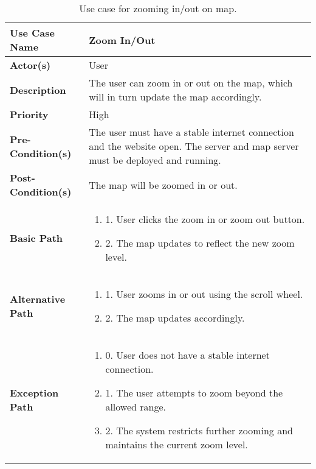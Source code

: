 \begin{table}[h]
    \centering
    \renewcommand{\arraystretch}{1.5}
    \begin{tabularx}{\textwidth}{|l|X|}
        \hline
        \rowcolor{gray!20}
        \textbf{Use Case Name} & Zoom In/Out \\
        \hline
        \textbf{Actor(s)} & User \\
        \hline
        \textbf{Description} & The user can zoom in or out on the map, which will in turn update the map accordingly. \\
        \hline
        \textbf{Priority} & High \\
        \hline
        \textbf{Pre-Condition(s)} & The user must have a stable internet connection and the website open. The server and map server must be deployed and running. \\
        \hline
        \textbf{Post-Condition(s)} & The map will be zoomed in or out. \\
        \hline
        \textbf{Basic Path} &  
        \begin{enumerate}[label=,left=0pt]
            \item 1. User clicks the zoom in or zoom out button.
            \item 2. The map updates to reflect the new zoom level.
        \end{enumerate} \\
        \hline
        \textbf{Alternative Path} & 
        \begin{enumerate}[label=,left=0pt]
            \item 1. User zooms in or out using the scroll wheel.
            \item 2. The map updates accordingly.
        \end{enumerate} \\
        \hline
        \textbf{Exception Path} & 
        \begin{enumerate}[label=,left=0pt]
            \item 0. User does not have a stable internet connection.
            \item 1. The user attempts to zoom beyond the allowed range.
            \item 2. The system restricts further zooming and maintains the current zoom level.
        \end{enumerate} \\
        \hline
    \end{tabularx}
    \caption[Use Case Specification: Zoom In/Out]{Use case for zooming in/out on map.}
    \label{tab:use_case_zoom_appendix}
\end{table}

